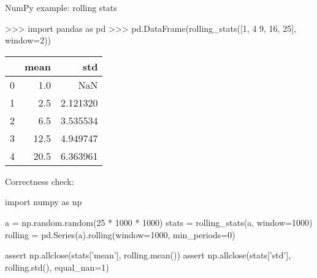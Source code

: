 \documentclass[10pt]{beamer}
\begin{document}
\begin{frame}[fragile]{NumPy example: rolling stats}

    \begin{pythoncode}
        >>> import pandas as pd
        >>> pd.DataFrame(rolling_stats([1, 4 9, 16, 25], window=2))
    \end{pythoncode}

    \pause

    \begin{center}
        \vspace{-0.2cm}\ttfamily\scriptsize
        \begin{tabular}{lrr} \toprule
                  & mean & std      \\ \midrule
                0 &  1.0 &  NaN     \\
                1 &  2.5 & 2.121320 \\
                2 &  6.5 & 3.535534 \\
                3 & 12.5 & 4.949747 \\
                4 & 20.5 & 6.363961 \\ \bottomrule
        \end{tabular}
        \vspace{-0.2cm}
    \end{center}

    \pause

    Correctness check:

    \begin{pythoncode}
        import numpy as np

        a = np.random.random(25 * 1000 * 1000)
        stats = rolling_stats(a, window=1000)
        rolling = pd.Series(a).rolling(window=1000, min_periods=0)

        assert np.allclose(stats['mean'], rolling.mean())
        assert np.allclose(stats['std'], rolling.std(), equal_nan=1)
    \end{pythoncode}

\end{frame}

\end{document}
